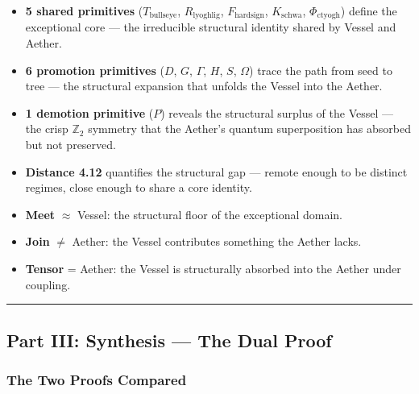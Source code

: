\documentclass[12pt,a4paper]{article}
\begin{document}
\begin{itemize}
    \item \textbf{5 shared primitives} ($T_{\text{bullseye}}$, $R_{\text{lyoghlig}}$, $F_{\text{hardsign}}$, $K_{\text{schwa}}$, $\Phi_{\text{ctyogh}}$) define the exceptional core --- the irreducible structural identity shared by Vessel and Aether.
    \item \textbf{6 promotion primitives} ($D$, $G$, $\Gamma$, $H$, $S$, $\Omega$) trace the path from seed to tree --- the structural expansion that unfolds the Vessel into the Aether.
    \item \textbf{1 demotion primitive} ($P$) reveals the structural surplus of the Vessel --- the crisp $\mathbb{Z}_2$ symmetry that the Aether's quantum superposition has absorbed but not preserved.
    \item \textbf{Distance 4.12} quantifies the structural gap --- remote enough to be distinct regimes, close enough to share a core identity.
    \item \textbf{Meet} $\approx$ Vessel: the structural floor of the exceptional domain.
    \item \textbf{Join} $\neq$ Aether: the Vessel contributes something the Aether lacks.
    \item \textbf{Tensor} = Aether: the Vessel is structurally absorbed into the Aether under coupling.
\end{itemize}

\begin{center}
\rule{0.5\textwidth}{0.4pt}
\end{center}

\subsection{Part III: Synthesis --- The Dual Proof}

\subsubsection{The Two Proofs Compared}
\end{document}
